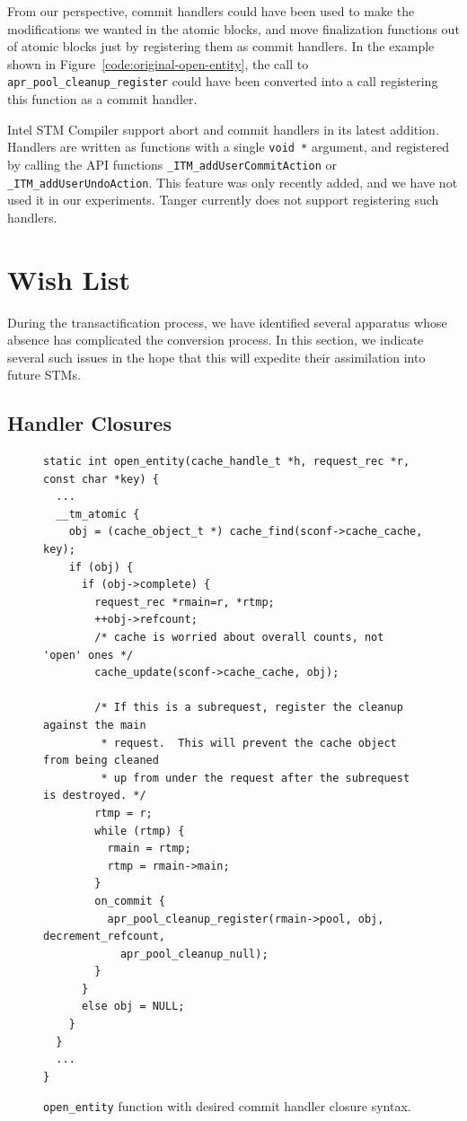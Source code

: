 \documentclass[11pt]{sigplanconf}
\begin{document}
 From our perspective, commit handlers could have been used to make the
modifications we wanted in the atomic blocks, and move finalization functions
out of atomic blocks just by registering them as commit handlers. In the 
example shown in Figure~\ref{code:original-open-entity}, 
the call to {\tt apr\_pool\_cleanup\_register} could have been
converted into a call registering this function as a commit handler. 

Intel STM Compiler support abort and commit handlers in its latest addition.
Handlers are written as functions with a single {\tt void~*} argument, and
registered by calling the API functions {\tt \_ITM\_add\-User\-Commit\-Action} or
{\tt \_ITM\_add\-User\-Undo\-Action}. This feature was only recently added, and we have
not used it in our experiments. {\sc Tanger} currently does not support
registering such handlers.

\section{Wish List}\label{sec:wishlist} 

During the transactification process, we have identified several apparatus whose
absence has complicated the conversion process. In this section, we indicate
several such issues in the hope that this will expedite their assimilation into
future STMs.

\subsection{Handler Closures}
\begin{figure}
\begin{lstlisting}
static int open_entity(cache_handle_t *h, request_rec *r, const char *key) {
  ...
  __tm_atomic {
    obj = (cache_object_t *) cache_find(sconf->cache_cache, key);
    if (obj) {
      if (obj->complete) {
        request_rec *rmain=r, *rtmp;
        ++obj->refcount;
        /* cache is worried about overall counts, not 'open' ones */
        cache_update(sconf->cache_cache, obj);

        /* If this is a subrequest, register the cleanup against the main
         * request.  This will prevent the cache object from being cleaned
         * up from under the request after the subrequest is destroyed. */
        rtmp = r;
        while (rtmp) {
          rmain = rtmp;
          rtmp = rmain->main;
        }
        on_commit {
          apr_pool_cleanup_register(rmain->pool, obj, decrement_refcount, 
            apr_pool_cleanup_null);
        }
      }
      else obj = NULL;
    }
  }
  ...
}
\end{lstlisting}
\caption{{\tt open\_entity} function with desired commit handler closure syntax.}
\label{code:closure-open-entity}
\end{figure}
\end{document}
